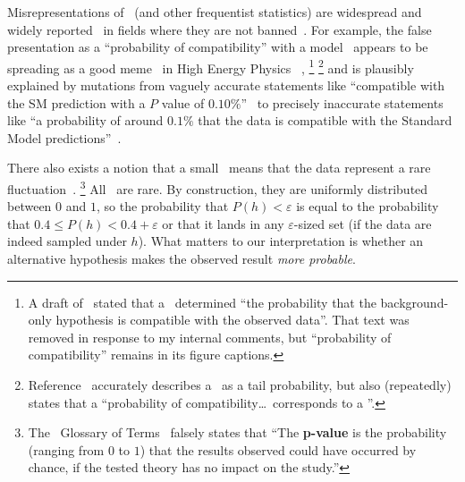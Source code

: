 Misrepresentations of \pvalues\ (and other frequentist statistics) are
widespread and widely reported~\cite{
schervish1996p,
Cohen1994TheEI,
Amrhein2017TheEI,
goodman2008dirty,
greenland2016no,
Bernstein2016princess,
wagenmakers2007practical
}
in fields where they are not banned~\cite{Trafimow2015ban}.
For example, the false presentation as a ``probability of compatibility'' with
a model~\cite{HIGG-2018-04} appears to be spreading as a good
meme~\cite{dawkins1989selfish} in High Energy Physics ~\cite{
HIGG-2017-09,
HIGG-2018-27,
HIGG-2018-51,
EXOT-2018-08,
HION-2018-19,
mastrandrea2019searches,
white2019search,
langford2021combination,
IceCube2013search,
IceCube2014searches,
gerasimov2021new
},%
\footnote{%
A draft of~\cite{HIGG-2018-51} stated that a \pvalue\ determined
``the probability that the background-only hypothesis is compatible with the
observed data''.
That text was removed in response to my internal comments, but
``probability of compatibility'' remains in its figure captions.%
}%
\footnote{%
Reference~\cite{HIGG-2018-57} accurately describes a \pvalue\ as a tail
probability, but also (repeatedly) states that a
``probability of compatibility\ldots\ corresponds to a \pvalue''.%
}%
and is plausibly explained by mutations from vaguely accurate statements like
``compatible with the SM prediction with a $P$ value of $0.10\%$''~\cite{
lhcb2021test
}
to precisely inaccurate statements like
``a probability of around $0.1\%$ that the data is compatible with the
Standard Model predictions''~\cite{cern2021test}.

There also exists a notion that a small \pvalue\ means that the data
represent a rare fluctuation~\cite{murray1997use, atlas2022pvalue}.%
\footnote{%
The \atlas\ Glossary of Terms~\cite{atlas2022pvalue} falsely states that
``The \textbf{p-value} is the probability (ranging from $0$ to $1$) that the
results observed could have occurred by chance, if the tested theory has no
impact on the study.''%
}
All \pvalues\ are rare.
By construction, they are uniformly distributed between $0$ and $1$, so the
probability that $P(h) < \varepsilon$ is equal to the probability that
$0.4 \leq P(h) < 0.4 + \varepsilon$ or that it lands in any
$\varepsilon$-sized set
(if the data are indeed sampled under $h$).
What matters to our interpretation is whether an alternative hypothesis
makes the observed result \emph{more probable}.

